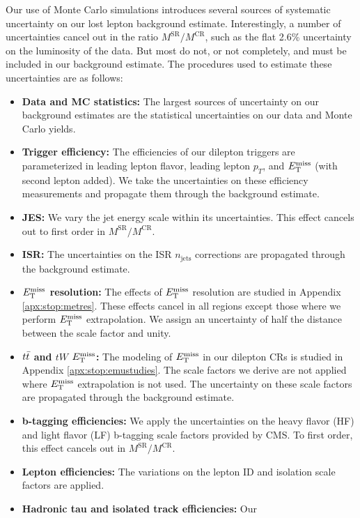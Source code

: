 Our use of Monte Carlo simulations introduces several sources of
systematic uncertainty on our lost lepton background
estimate. Interestingly, a number of uncertainties cancel out in the
ratio $M^\text{SR} / M^\text{CR}$, such as the flat 2.6\% uncertainty
on the luminosity of the data. But most do not, or not completely, and
must be included in our background estimate. The procedures used to
estimate these uncertainties are as follows:

\begin{itemize}
\item \textbf{Data and MC statistics:} The largest sources of uncertainty
  on our background estimates are the statistical uncertainties on our
  data and Monte Carlo yields.
\item \textbf{Trigger efficiency:} The efficiencies of our dilepton
  triggers are parameterized in leading lepton flavor, leading lepton
  $p_T$, and $E_\text{T}^\text{miss}$ (with second lepton added). We take the
  uncertainties on these efficiency measurements and propagate them
  through the background estimate.
\item \textbf{JES:} We vary the jet energy scale within its
  uncertainties. This effect cancels out to first order in
  $M^\text{SR} / M^\text{CR}$.
\item \textbf{ISR:} The uncertainties on the ISR $n_\text{jets}$ corrections are
  propagated through the background estimate.
\item \textbf{$E_\text{T}^\text{miss}$ resolution:} The effects of $E_\text{T}^\text{miss}$ resolution are
  studied in Appendix \ref{apx:stop:metres}. These effects cancel in all regions
  except those where we perform $E_\text{T}^\text{miss}$ extrapolation. We assign an
  uncertainty of half the distance between the scale factor and
  unity.
\item \textbf{$t\bar{t}$ and $tW$ $E_\text{T}^\text{miss}$:} The modeling of $E_\text{T}^\text{miss}$ in our
  dilepton CRs is studied in Appendix \ref{apx:stop:emustudies}. The
  scale factors we derive are not applied where $E_\text{T}^\text{miss}$ extrapolation
  is not used. The uncertainty on these scale factors are propagated
  through the background estimate.
\item \textbf{b-tagging efficiencies:} We apply the uncertainties on the heavy
  flavor (HF) and light flavor (LF) b-tagging scale factors provided
  by CMS. To first order, this effect cancels out in $M^\text{SR} /
  M^\text{CR}$.
\item \textbf{Lepton efficiencies:} The variations on the lepton ID
  and isolation scale factors are applied.
\item \textbf{Hadronic tau and isolated track efficiencies:} Our

\end{itemize}

